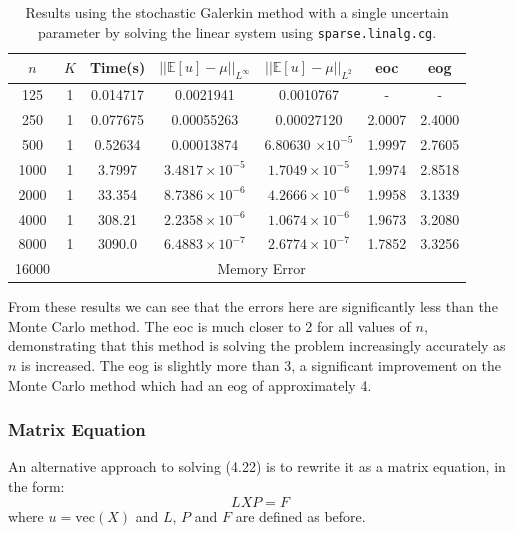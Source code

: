 \documentclass[11pt]{article}
\numberwithin{equation}{section}
\begin{document}
\begin{table}[H]
\centering
\begin{tabular}{|c|c|c|c|c|c|c|}
\hline
$n$ & $K$ & Time(s) & $|| \mathbb{E}[u] - \mu ||_{L^{\infty}}$ & $|| \mathbb{E}[u] - \mu ||_{L^{2}}$ & eoc & eog \\
\hline
125 & 1 & 0.014717 & 0.0021941 & 0.0010767 & - & - \\
250 & 1 & 0.077675 & 0.00055263 & 0.00027120 & 2.0007 & 2.4000 \\
500 & 1 & 0.52634 & 0.00013874 & 6.80630 $\times 10^{-5}$ & 1.9997 & 2.7605 \\
1000 & 1 & 3.7997 & $3.4817 \times 10^{-5}$ & $1.7049 \times 10^{-5}$ & 1.9974 & 2.8518  \\
2000 & 1 & 33.354 & $8.7386 \times 10^{-6}$ & $4.2666 \times 10^{-6}$ & 1.9958 & 3.1339 \\
4000 & 1 & 308.21 & $2.2358 \times 10^{-6}$ & $1.0674 \times 10^{-6}$ & 1.9673 & 3.2080 \\
8000 & 1 & 3090.0 & $6.4883 \times 10^{-7}$ & $2.6774 \times 10^{-7}$ & 1.7852 & 3.3256 \\
\cline{2-7}
16000 & \multicolumn{6}{c|}{Memory Error} \\
\hline
\end{tabular}
\captionsetup{justification=centering}
\caption{Results using the stochastic Galerkin method with a single uncertain parameter by solving the linear system using \texttt{sparse.linalg.cg}.}
\label{table:stochastic linear}
\end{table}

From these results we can see that the errors here are significantly less than the Monte Carlo method. The eoc is much closer to 2 for all values of $n$, demonstrating that this method is solving the problem increasingly accurately as $n$ is increased. The eog is slightly more than 3, a significant improvement on the Monte Carlo method which had an eog of approximately 4. 

\subsubsection*{Matrix Equation}
An alternative approach to solving (4.22) is to rewrite it as a matrix equation, in the form:
\begin{equation}
LXP = F
\end{equation} 
where $u = \text{vec}(X)$ and $L$, $P$ and $F$ are defined as before. 
\end{document}
